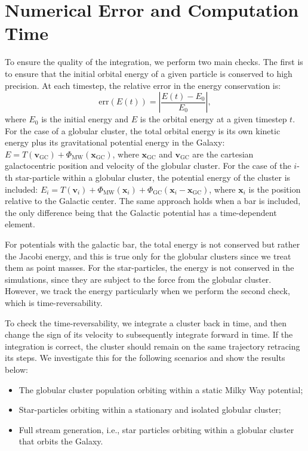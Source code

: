 \section{Numerical Error and Computation Time}
    To ensure the quality of the integration, we perform two main checks. The first is to ensure that the initial orbital energy of a given particle is conserved to high precision. At each timestep, the relative error in the energy conservation is:
    \begin{equation} 
        \mathrm{err}(E(t)) = \left|\frac{E(t) - E_0}{E_0}\right|,
    \end{equation} 
    where $E_0$ is the initial energy and $E$ is the orbital energy at a given timestep $t$. For the case of a globular cluster, the total orbital energy is its own kinetic energy plus its gravitational potential energy in the Galaxy: $E = T(\mathbf{v}_{\mathrm{GC}}) + \Phi_{\mathrm{MW}}\left(\mathbf{x}_{\mathrm{GC}}\right)$, where $\mathbf{x}_{\mathrm{GC}}$ and $\mathbf{v}_{\mathrm{GC}}$ are the cartesian galactocentric position and velocity of the globular cluster. For the case of the $i$-th star-particle within a globular cluster, the potential energy of the cluster is included: $E_i = T(\textbf{v}_i) + \Phi_{\mathrm{MW}}\left(\textbf{x}_i\right) + \Phi_\mathrm{GC}\left(\textbf{x}_i - \textbf{x}_{\mathrm{GC}}\right)$, where $\mathbf{x}_i$ is the position relative to the Galactic center. The same approach holds when a bar is included, the only difference being that the Galactic potential has a time-dependent element. 

    For potentials with the galactic bar, the total energy is not conserved but rather the Jacobi energy, and this is true only for the globular clusters since we treat them as point masses. For the star-particles, the energy is not conserved in the simulations, since they are subject to the force from the globular cluster. However, we track the energy particularly when we perform the second check, which is time-reversability.

    To check the time-reversability, we integrate a cluster back in time, and then change the sign of its velocity to subsequently integrate forward in time. If the integration is correct, the cluster should remain on the same trajectory retracing its steps. We investigate this for the following scenarios and show the results below: 
    \begin{itemize}
        \item The globular cluster population orbiting within a static Milky Way potential;
        \item Star-particles orbiting within a stationary and isolated globular cluster;
        \item Full stream generation, i.e., star particles orbiting within a globular cluster that orbits the Galaxy.
    \end{itemize}

